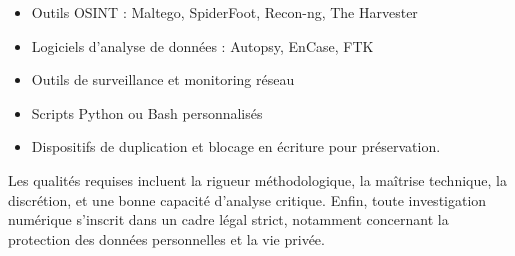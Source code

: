 \documentclass[12pt, a4paper]{article}
\begin{document}
	\begin{itemize}[leftmargin=*]
		\item Outils OSINT : Maltego, SpiderFoot, Recon-ng, The Harvester
		\item Logiciels d'analyse de données : Autopsy, EnCase, FTK
		\item Outils de surveillance et monitoring réseau
		\item Scripts Python ou Bash personnalisés
		\item Dispositifs de duplication et blocage en écriture pour préservation.
	\end{itemize}
	
	Les qualités requises incluent la rigueur méthodologique, la maîtrise technique, la discrétion, et une bonne capacité d'analyse critique. Enfin, toute investigation numérique s'inscrit dans un cadre légal strict, notamment concernant la protection des données personnelles et la vie privée.
	
\end{document}
